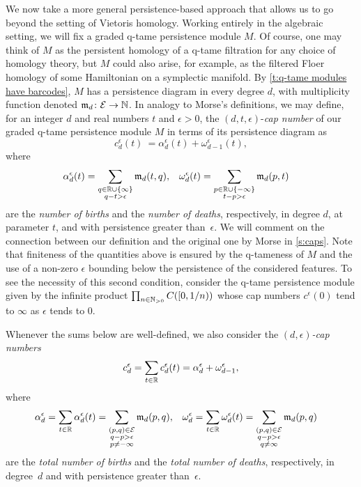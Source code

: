 We now take a more general persistence-based approach that allows us to go beyond the setting of Vietoris homology.
Working entirely in the algebraic setting, we will fix a graded q-tame persistence module $M$.
Of course, one may think of $M$ as the persistent homology of a q-tame filtration for any choice of homology theory, but $M$ could also arise, for example, as the filtered Floer homology of some Hamiltonian on a symplectic manifold.
By \cref{t:q-tame modules have barcodes}, $M$ has a persistence diagram in every degree $d$, with multiplicity function denoted $\mathfrak{m}_d \colon \mathcal{E} \to \mathbb{N}$.
In analogy to Morse's definitions, we may define, for an integer $d$ and real numbers $t$ and $\epsilon > 0$, the $(d, t, \epsilon)$-\emph{cap number} of our graded q-tame persistence module $M$ in terms of its persistence diagram as
\begin{equation*}
c_{d}^{\epsilon}(t) \ =
\alpha_{d}^{\epsilon}(t) + \omega_{d-1}^{\epsilon}(t),
\end{equation*}
where 
\begin{align*}
\alpha_{d}^{\epsilon}(t) &= \sum_{\substack{q \in \mathbb{R} \cup \{\infty\} \\ q - t > \epsilon}} \mathfrak{m}_d(t, q),
&
\omega_{d}^{\epsilon}(t) &= \sum_{\substack{p \in \mathbb{R} \cup \{-\infty\} \\ t - p > \epsilon}} \mathfrak{m}_{d}(p, t) 
\end{align*}
are the \emph{number of births} and the \emph{number of deaths}, respectively, in degree $d$, at parameter $t$, and with persistence greater than~$\epsilon$.
We will comment on the connection between our definition and the original one by Morse in \cref{s:caps}.
Note that finiteness of the quantities above is ensured by the q-tameness of $M$ and the use of a non-zero $\epsilon$ bounding below the persistence of the considered features.
To see the necessity of this second condition, consider the q-tame persistence module given by the infinite product $\prod_{n \in \mathbb{N}_{> 0}} C([0,1/n))$ whose cap numbers $c^{\epsilon}(0)$ tend to $\infty$ as $\epsilon$ tends to 0.

Whenever the sums below are well-defined, we also consider the \emph{$(d,\epsilon)$-cap numbers}
\[
c_{d}^{\epsilon} = \sum_{t \in \mathbb{R}} c_{d}^{\epsilon}(t)  = \alpha_{d}^{\epsilon} + \omega_{d-1}^{\epsilon},
\]
where
\begin{align*}
\alpha_{d}^{\epsilon} &= \sum_{t \in \mathbb{R}} \alpha_{d}^{\epsilon}(t) = \sum_{\substack{(p,q) \in \mathcal{E} \\ q - p > \epsilon \\ p \neq -\infty}}\mathfrak{m}_d(p,q),
&
\omega_{d}^{\epsilon} &= \sum_{t \in \mathbb{R}} \omega_{d}^{\epsilon}(t) = \sum_{\substack{(p,q) \in \mathcal{E} \\ q - p > \epsilon \\ q \neq \infty}} \mathfrak{m}_{d}(p,q)
\end{align*}
are the \emph{total number of births} and the \emph{total number of deaths}, respectively, in degree~$d$ and with persistence greater than~$\epsilon$.

